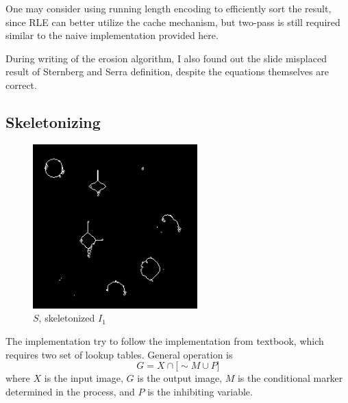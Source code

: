 \documentclass[12pt]{article}
\begin{document}
One may consider using running length encoding to efficiently sort the result, since RLE can better utilize the cache mechanism, but two-pass is still required similar to the naive implementation provided here.

During writing of the erosion algorithm, I also found out the slide misplaced result of Sternberg and Serra definition, despite the equations themselves are correct.

\subsection*{Skeletonizing}
\begin{figure}[H]
    \centering
    \includegraphics[height=2.5in]{images/S}
    \caption{$S$, skeletonized $I_1$}
\end{figure}
The implementation try to follow the implementation from textbook, which requires two set of lookup tables. General operation is 
\begin{equation}
	G = X \cap \lbrack \sim M \cup P \rbrack
\end{equation}
where $X$ is the input image, $G$ is the output image, $M$ is the conditional marker determined in the process, and $P$ is the inhibiting variable.
\end{document}
